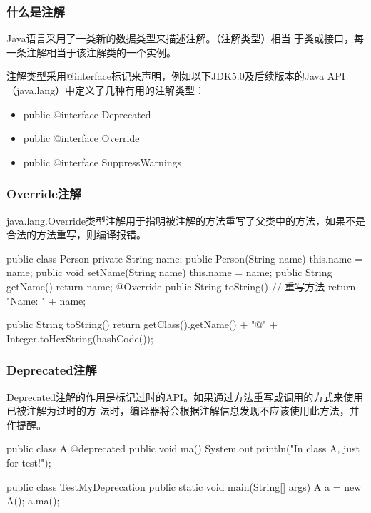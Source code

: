 \begin{frame}[fragile] %
  \frametitle{什么是注解}

  Java语言采用了一类新的数据类型来描述注解。（{\hei\Red 注解类型}）相当
  于类或接口，每一条注解相当于该注解类的一个实例。

  注解类型采用@interface标记来声明，例如以下JDK5.0及后续版本的Java
  API（java.lang）中定义了几种有用的注解类型：
  
  \begin{itemize}
  \item public @interface Deprecated
  \item public @interface Override
  \item public @interface SuppressWarnings
  \end{itemize}
\end{frame}

\begin{frame}[fragile] %
  \frametitle{Override注解}

  java.lang.Override类型注解用于指明被注解的方法重写了父类中的方法，如果不是合法的方法重写，则编译报错。

  \begin{javaCode}
    public class Person {
      private String name;
      public Person(String name) {
        this.name = name; 
      }
      public void setName(String name) {
        this.name = name; 
      }
      public String getName() {
        return name; 
      }
      @Override
      public String toString() { // 重写方法
        return "Name: " + name; 
      }
    }
  \end{javaCode}

  \begin{javaCode}
    public String toString() {
      return getClass().getName() + "@" + Integer.toHexString(hashCode());
    }  
  \end{javaCode}
\end{frame}

\begin{frame}[fragile] %
  \frametitle{Deprecated注解}

  Deprecated注解的作用是标记过时的API。如果通过方法重写或调用的方式来使用已被注解为过时的方
  法时，编译器将会根据注解信息发现不应该使用此方法，并作提醒。

  \begin{javaCode}
    public class A { 
      @deprecated
      public void ma() {
        System.out.println("In class A, just for test!");
      } 
    }
  \end{javaCode}

  \begin{javaCode}
    public class TestMyDeprecation {
      public static void main(String[] args) {
        A a = new A();
        a.ma(); 
      }
    }
  \end{javaCode}
\end{frame}

